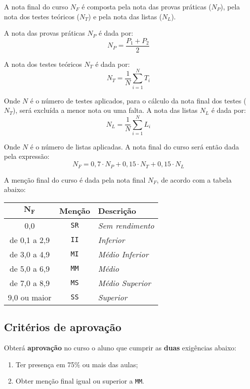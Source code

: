 A nota final do curso $N_F$ é composta pela nota das provas práticas ($N_P$), pela nota dos testes teóricos ($N_T$) e pela nota das listas ($N_L$).

A nota das provas práticas $N_P$ é dada por:
\[
    N_P = \frac{P_1 + P_2}{2}
\]

A nota dos testes teóricos $N_T$ é dada por:
\[
    N_T = \frac{1}{N} \sum_{i = 1}^N T_i
\]

Onde $N$ é o número de testes aplicados, para o cálculo da nota final dos testes ($N_T$), será excluída a menor nota ou uma falta. A nota das listas $N_L$ é dada por:
\[
	N_L = \frac{1}{N} \sum_{i = 1}^N L_i
\]

Onde $N$ é o número de listas aplicadas. A nota final do curso será então dada pela expressão:
\[
	N_F = 0,7\cdot N_P + 0,15\cdot N_T + 0,15\cdot N_L
\]

A menção final do curso é dada pela nota final $N_F$, de acordo com a tabela abaixo:

\begin{center}
\begin{tabularx}{0.6\textwidth}{ccX}
\toprule
$\mathbf{N_F}$ & \textbf{Menção} & \textbf{Descrição} \\
\toprule
\rowcolor[gray]{.9}
0,0 & \texttt{SR} & \textit{Sem rendimento} \\
de 0,1 a 2,9 & \texttt{II} & \textit{Inferior} \\
\rowcolor[gray]{.9}
de 3,0 a 4,9 & \texttt{MI} & \textit{Médio Inferior} \\
de 5,0 a 6,9 & \texttt{MM} & \textit{Médio} \\
\rowcolor[gray]{.9}
de 7,0 a 8,9 & \texttt{MS} & \textit{Médio Superior} \\
9,0 ou maior & \texttt{SS} & \textit{Superior} \\
\bottomrule
\end{tabularx}
\end{center}

\subsection{Critérios de aprovação}

Obterá \textbf{aprovação} no curso o aluno que cumprir as \textbf{duas} exigências abaixo:

\begin{enumerate}
	\item Ter presença em 75\% ou mais das aulas;
	\item Obter menção final igual ou superior a \texttt{MM}.
\end{enumerate}
